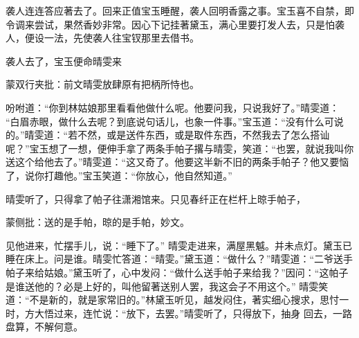 \begin{parag}
    袭人连连答应著去了。回来正值宝玉睡醒，袭人回明香露之事。宝玉喜不自禁，即令调来尝试，果然香妙非常。因心下记挂著黛玉，满心里要打发人去，只是怕袭人，便设一法，先使袭人往宝钗那里去借书。
\end{parag}


\begin{parag}
    袭人去了，宝玉便命晴雯来\begin{note}蒙双行夹批：前文晴雯放肆原有把柄所恃也。\end{note}吩咐道：“你到林姑娘那里看看他做什么呢。他要问我，只说我好了。”晴雯道： “白眉赤眼，做什么去呢？到底说句话儿，也象一件事。”宝玉道：“没有什么可说的。”晴雯道：“若不然，或是送件东西，或是取件东西，不然我去了怎么搭讪 呢？”宝玉想了一想，便伸手拿了两条手帕子撂与晴雯，笑道：“也罢，就说我叫你送这个给他去了。”晴雯道：“这又奇了。他要这半新不旧的两条手帕子？他又要恼了，说你打趣他。”宝玉笑道：“你放心，他自然知道。”
\end{parag}


\begin{parag}
    晴雯听了，只得拿了帕子往潇湘馆来。只见春纤正在栏杆上晾手帕子，\begin{note}蒙侧批：送的是手帕，晾的是手帕，妙文。\end{note}见他进来，忙摆手儿，说：“睡下了。” 晴雯走进来，满屋黑魆。并未点灯。黛玉已睡在床上。问是谁。晴雯忙答道：“晴雯。”黛玉道：“做什么？”晴雯道：“二爷送手帕子来给姑娘。”黛玉听了，心中发闷：“做什么送手帕子来给我？”因问：“这帕子是谁送他的？必是上好的，叫他留著送别人罢，我这会子不用这个。” 晴雯笑道：“不是新的，就是家常旧的。”林黛玉听见，越发闷住，著实细心搜求，思忖一时，方大悟过来，连忙说：“放下，去罢。”晴雯听了，只得放下，抽身 回去，一路盘算，不解何意。
\end{parag}


